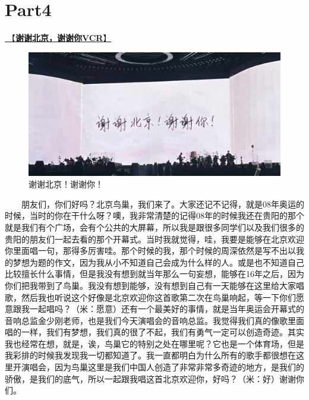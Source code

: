 \documentclass[]{ctexbook}
\begin{document}
\newpage

\section{Part4}\label{beijing-20240921-part4}

\hyperref[thank-you-vcr]{🎥【\textbf{谢谢北京，谢谢你VCR}】}

\begin{figure}

{\centering \includegraphics[width=400pt]{img/beijing20240921/thank-beijing} 

}

\caption{谢谢北京！谢谢你！}\label{fig:unnamed-chunk-97}
\end{figure}

  朋友们，你们好吗？北京鸟巢，我们来了。大家还记不记得，就是08年奥运的时候，当时的你在干什么呀？噢，我非常清楚的记得08年的时候我还在贵阳的那个就是我们有个广场，会有个公共的大屏幕，所以我是跟很多同学们以及我们很多的贵阳的朋友们一起去看的那个开幕式。当时我就觉得，哇，我要是能够在北京欢迎你里面唱一句，那得多厉害哇。那个时候的我，那个时候的周深依然是写不出以我的梦想为题的作文，因为我从小不知道自己会成为什么样的人。或是也不知道自己比较擅长什么事情，但是我没有想到就当年那么一句妄想，能够在16年之后，因为你们把我带到了鸟巢。我没有想到能够，没有想到自己有一天能够在这里给大家唱歌，然后我也听说这个好像是北京欢迎你这首歌第二次在鸟巢响起，等一下你们愿意跟我一起唱吗？（米：愿意）还有一个最美好的事情，就是当年奥运会开幕式的音响总监金少刚老师，也是我们今天演唱会的音响总监。我觉得我们真的像歌里面唱的一样，我们有梦想，我们真的很了不起，我们有勇气一定可以创造奇迹。其实我也经常在想，就是，诶，鸟巢它的特别之处在哪里呢？它也是一个体育场，但是我彩排的时候我发现我一切都知道了。我一直都明白为什么所有的歌手都很想在这里开演唱会，因为鸟巢这里是我们中国人创造了非常非常多奇迹的地方，是我们的骄傲，是我们的底气，所以一起跟我唱这首北京欢迎你，好吗？（米：好）谢谢你们。
\end{document}
